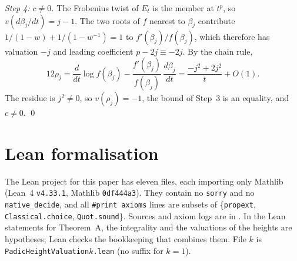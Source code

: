 \documentclass[11pt,a4paper]{amsart}
\theoremstyle{plain}
\theoremstyle{definition}
\theoremstyle{remark}
\begin{document}
\emph{Step 4: $c\ne0$.} The Frobenius twist of $E_t$ is the member at $t^p$, so $v(d\beta_j/dt)=j-1$. The two roots of $f$ nearest to $\beta_j$ contribute $1/(1-w)+1/(1-w^{-1})=1$ to $f'(\beta_j)/f(\beta_j)$, which therefore has valuation $-j$ and leading coefficient $p-2j\equiv-2j$. By the chain rule,
\[
12\rho_j=\frac{d}{dt}\log f(\beta_j)-\frac{f'(\beta_j)}{f(\beta_j)}\,\frac{d\beta_j}{dt}=\frac{-j^2+2j^2}{t}+O(1).
\]
The residue is $j^2\ne0$, so $v(\rho_j)=-1$, the bound of Step~3 is an equality, and $c\ne0$. \qed

\section{Lean formalisation}\label{app:lean}

The Lean project for this paper has eleven files, each importing only Mathlib (Lean~4 \texttt{v4.33.1}, Mathlib \texttt{0df444a3}). They contain no \texttt{sorry} and no \texttt{native\_decide}, and all \texttt{\#print axioms} lines are subsets of \{\texttt{propext}, \texttt{Classical.choice}, \texttt{Quot.sound}\}. Sources and axiom logs are in \cite{Repo}. In the Lean statements for Theorem~A, the integrality and the valuations of the heights are hypotheses; Lean checks the bookkeeping that combines them. File $k$ is \texttt{PadicHeightValuation}$k$\texttt{.lean} (no suffix for $k=1$).
\end{document}
